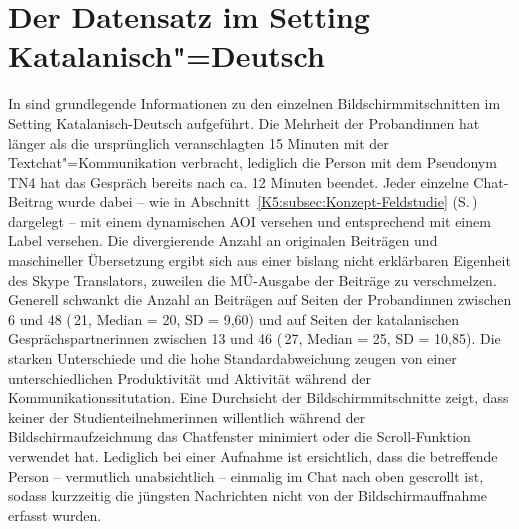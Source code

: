 
\section{Der Datensatz im Setting Katalanisch"=Deutsch}

\label{K6:sec:DatenCatDe}


In  sind grundlegende Informationen zu den einzelnen Bildschirmmitschnitten im Setting Katalanisch-Deutsch aufgeführt. Die Mehrheit der Proband{\textperiodcentered}innen hat länger als die ursprünglich veranschlagten 15 Minuten mit der Textchat"=Kommunikation verbracht, lediglich die Person mit dem Pseudonym TN4 hat das Gespräch bereits nach ca. 12 Minuten beendet. Jeder einzelne Chat-Beitrag wurde dabei -- wie in Abschnitt~\ref{K5:subsec:Konzept-Feldstudie} (S.\,\pageref{K5:subsec:Konzept-Feldstudie}) dargelegt -- mit einem dynamischen AOI versehen und entsprechend mit einem Label versehen. Die divergierende Anzahl an originalen Beiträgen und maschineller Übersetzung ergibt sich aus einer bislang nicht erklärbaren Eigenheit des Skype Translators, zuweilen die MÜ-Ausgabe der Beiträge zu verschmelzen. Generell schwankt die Anzahl an Beiträgen auf Seiten der Proband{\textperiodcentered}innen zwischen 6 und 48 (\diameter\,21, Median = 20, SD = 9,60) und auf Seiten der katalanischen Gesprächspartner{\textperiodcentered}innen zwischen 13 und 46 (\diameter\,27, Median = 25, SD = 10,85). Die starken Unterschiede und die hohe Standardabweichung zeugen von einer unterschiedlichen Produktivität und Aktivität während der Kommunikationssitutation. Eine Durchsicht der Bildschirmmitschnitte zeigt, dass keine{\textperiodcentered}r der Studienteilnehmer{\textperiodcentered}innen willentlich während der Bildschirmaufzeichnung das Chatfenster minimiert oder die Scroll-Funktion verwendet hat. Lediglich bei einer Aufnahme ist ersichtlich, dass die betreffende Person -- vermutlich unabsichtlich -- einmalig im Chat nach oben gescrollt ist, sodass kurzzeitig die jüngsten Nachrichten nicht von der Bildschirmauffnahme erfasst wurden.





